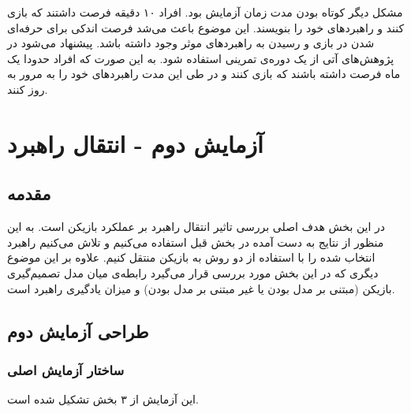 \documentclass[twoside, a4paper,11pt]{book}
\numberwithin{equation}{chapter}
\numberwithin{table}{chapter}
\numberwithin{figure}{chapter}
\numberwithin{equation}{chapter}
\begin{document}
مشکل دیگر کوتاه بودن مدت زمان آزمایش بود. افراد ۱۰ دقیقه فرصت داشتند که بازی کنند و راهبردهای خود را بنویسند. این موضوع باعث می‌شد فرصت اندکی برای حرفه‌ای شدن در بازی و رسیدن به راهبردهای موثر وجود داشته باشد. پیشنهاد می‌شود در پژوهش‌های آتی از یک دوره‌ی تمرینی استفاده شود. به این صورت که افراد حدودا یک ماه فرصت داشته باشند که بازی کنند و در طی این مدت راهبردهای خود را به مرور به روز کنند.

\chapter{آزمایش دوم - انتقال راهبرد}
\label{chapter:PartTwoTransfer}
\thispagestyle{plain}

\section{مقدمه}
در این بخش هدف اصلی بررسی تاثیر انتقال راهبرد بر عملکرد بازیکن است. به این منظور از نتایج به دست آمده در بخش قبل استفاده می‌کنیم و تلاش می‌کنیم راهبرد انتخاب شده را با استفاده از دو روش به بازیکن منتقل کنیم. علاوه بر این موضوع دیگری که در این بخش مورد بررسی قرار می‌گیرد رابطه‌ی میان مدل تصمیم‌گیری بازیکن (مبتنی بر مدل بودن یا غیر مبتنی بر مدل بودن) و میزان یادگیری راهبرد است.

\section{طراحی آزمایش دوم}
\subsection{ساختار آزمایش اصلی} \label{partTwoMainTest}

این آزمایش از ۳ بخش تشکیل شده است.
\end{document}
